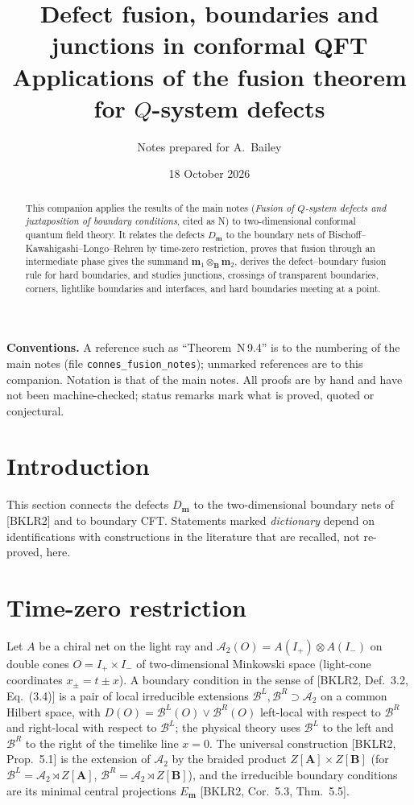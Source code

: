 \documentclass[11pt]{article}
\title{Defect fusion, boundaries and junctions in conformal QFT\\[2pt]\large Applications of the fusion theorem for $Q$-system defects}
\author{Notes prepared for A.~Bailey}
\date{18 October 2026}
\theoremstyle{definition}
\theoremstyle{remark}
\newcommand{\cA}{\mathcal A}
\newcommand{\cB}{\mathcal B}
\newcommand{\bfB}{\mathbf B}
\newcommand{\bfA}{\mathbf A}
\begin{document}
\maketitle
\begin{abstract}
\noindent This companion applies the results of the main notes (\emph{Fusion of $Q$-system defects and juxtaposition of boundary conditions}, cited as N) to two-dimensional conformal quantum field theory. It relates the defects $D_{\mathbf m}$ to the boundary nets of Bischoff--Kawahigashi--Longo--Rehren by time-zero restriction, proves that fusion through an intermediate phase gives the summand $\mathbf m_1\otimes_{\bfB}\mathbf m_2$, derives the defect--boundary fusion rule for hard boundaries, and studies junctions, crossings of transparent boundaries, corners, lightlike boundaries and interfaces, and hard boundaries meeting at a point.
\end{abstract}
\noindent\textbf{Conventions.} A reference such as ``Theorem~N\,9.4'' is to the numbering of the main notes (file \texttt{connes\_fusion\_notes}); unmarked references are to this companion. Notation is that of the main notes. All proofs are by hand and have not been machine-checked; status remarks mark what is proved, quoted or conjectural.

\tableofcontents

\section{Introduction}\label{sec:apps}
This section connects the defects $D_{\mathbf m}$ to the two-dimensional boundary nets of [BKLR2] and to boundary CFT. Statements marked \emph{dictionary} depend on identifications with constructions in the literature that are recalled, not re-proved, here.

\section{Time-zero restriction}\label{sec:tz}
Let $A$ be a chiral net on the light ray and $\cA_2(O)=A(I_+)\otimes A(I_-)$ on double cones $O=I_+\times I_-$ of two-dimensional Minkowski space (light-cone coordinates $x_\pm=t\pm x$). A boundary condition in the sense of [BKLR2, Def.~3.2, Eq.~(3.4)] is a pair of local irreducible extensions $\cB^L,\cB^R\supset\cA_2$ on a common Hilbert space, with $D(O)=\cB^L(O)\vee\cB^R(O)$ left-local with respect to $\cB^R$ and right-local with respect to $\cB^L$; the physical theory uses $\cB^L$ to the left and $\cB^R$ to the right of the timelike line $x=0$. The universal construction [BKLR2, Prop.~5.1] is the extension of $\cA_2$ by the braided product $Z[\bfA]\times Z[\bfB]$ (for $\cB^L=\cA_2\rtimes Z[\bfA]$, $\cB^R=\cA_2\rtimes Z[\bfB]$), and the irreducible boundary conditions are its minimal central projections $E_{\mathbf m}$ [BKLR2, Cor.~5.3, Thm.~5.5].
\end{document}
